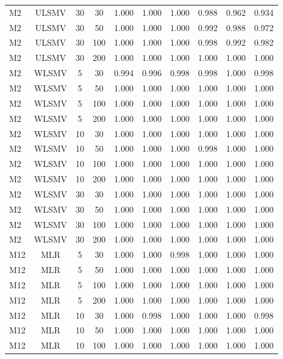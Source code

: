 {\begin{longtable}[!tbp]{@{\extracolsep{\fill}}lccccccccc}
  M2 & ULSMV & 30 & 30 & 1.000 & 1.000 & 1.000 & 0.988 & 0.962 & 0.934 \\ 
  M2 & ULSMV & 30 & 50 & 1.000 & 1.000 & 1.000 & 0.992 & 0.988 & 0.972 \\ 
  M2 & ULSMV & 30 & 100 & 1.000 & 1.000 & 1.000 & 0.998 & 0.992 & 0.982 \\ 
  M2 & ULSMV & 30 & 200 & 1.000 & 1.000 & 1.000 & 1.000 & 1.000 & 1.000 \\ 
  M2 & WLSMV & 5 & 30 & 0.994 & 0.996 & 0.998 & 0.998 & 1.000 & 0.998 \\ 
  M2 & WLSMV & 5 & 50 & 1.000 & 1.000 & 1.000 & 1.000 & 1.000 & 1.000 \\ 
  M2 & WLSMV & 5 & 100 & 1.000 & 1.000 & 1.000 & 1.000 & 1.000 & 1.000 \\ 
  M2 & WLSMV & 5 & 200 & 1.000 & 1.000 & 1.000 & 1.000 & 1.000 & 1.000 \\ 
  M2 & WLSMV & 10 & 30 & 1.000 & 1.000 & 1.000 & 1.000 & 1.000 & 1.000 \\ 
  M2 & WLSMV & 10 & 50 & 1.000 & 1.000 & 1.000 & 0.998 & 1.000 & 1.000 \\ 
  M2 & WLSMV & 10 & 100 & 1.000 & 1.000 & 1.000 & 1.000 & 1.000 & 1.000 \\ 
  M2 & WLSMV & 10 & 200 & 1.000 & 1.000 & 1.000 & 1.000 & 1.000 & 1.000 \\ 
  M2 & WLSMV & 30 & 30 & 1.000 & 1.000 & 1.000 & 1.000 & 1.000 & 1.000 \\ 
  M2 & WLSMV & 30 & 50 & 1.000 & 1.000 & 1.000 & 1.000 & 1.000 & 1.000 \\ 
  M2 & WLSMV & 30 & 100 & 1.000 & 1.000 & 1.000 & 1.000 & 1.000 & 1.000 \\ 
  M2 & WLSMV & 30 & 200 & 1.000 & 1.000 & 1.000 & 1.000 & 1.000 & 1.000 \\ 
  M12 & MLR & 5 & 30 & 1.000 & 1.000 & 0.998 & 1.000 & 1.000 & 1.000 \\ 
  M12 & MLR & 5 & 50 & 1.000 & 1.000 & 1.000 & 1.000 & 1.000 & 1.000 \\ 
  M12 & MLR & 5 & 100 & 1.000 & 1.000 & 1.000 & 1.000 & 1.000 & 1.000 \\ 
  M12 & MLR & 5 & 200 & 1.000 & 1.000 & 1.000 & 1.000 & 1.000 & 1.000 \\ 
  M12 & MLR & 10 & 30 & 1.000 & 0.998 & 1.000 & 1.000 & 1.000 & 0.998 \\ 
  M12 & MLR & 10 & 50 & 1.000 & 1.000 & 1.000 & 1.000 & 1.000 & 1.000 \\ 
  M12 & MLR & 10 & 100 & 1.000 & 1.000 & 1.000 & 1.000 & 1.000 & 1.000 \\ 

\end{longtable}}
